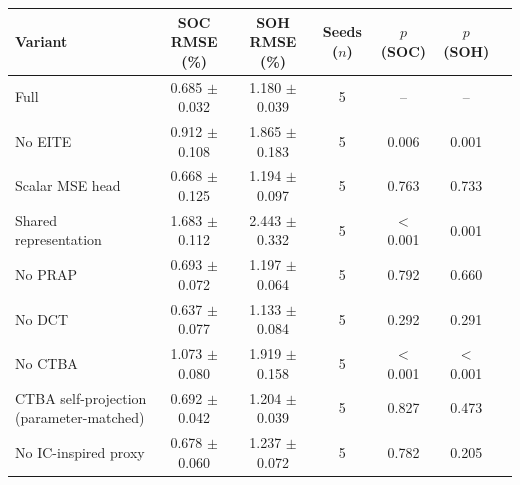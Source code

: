 \begin{tabular}{lcccccc}
\toprule
Variant & SOC RMSE (\%) & SOH RMSE (\%) & Seeds ($n$) & $p$ (SOC) & $p$ (SOH) \\
\midrule
Full & 0.685 $\pm$ 0.032 & 1.180 $\pm$ 0.039 & 5 & -- & -- \\
No EITE & 0.912 $\pm$ 0.108 & 1.865 $\pm$ 0.183 & 5 & 0.006 & 0.001 \\
Scalar MSE head & 0.668 $\pm$ 0.125 & 1.194 $\pm$ 0.097 & 5 & 0.763 & 0.733 \\
Shared representation & 1.683 $\pm$ 0.112 & 2.443 $\pm$ 0.332 & 5 & $<$0.001 & 0.001 \\
No PRAP & 0.693 $\pm$ 0.072 & 1.197 $\pm$ 0.064 & 5 & 0.792 & 0.660 \\
No DCT & 0.637 $\pm$ 0.077 & 1.133 $\pm$ 0.084 & 5 & 0.292 & 0.291 \\
No CTBA & 1.073 $\pm$ 0.080 & 1.919 $\pm$ 0.158 & 5 & $<$0.001 & $<$0.001 \\
CTBA self-projection (parameter-matched) & 0.692 $\pm$ 0.042 & 1.204 $\pm$ 0.039 & 5 & 0.827 & 0.473 \\
No IC-inspired proxy & 0.678 $\pm$ 0.060 & 1.237 $\pm$ 0.072 & 5 & 0.782 & 0.205 \\
\bottomrule
\end{tabular}
